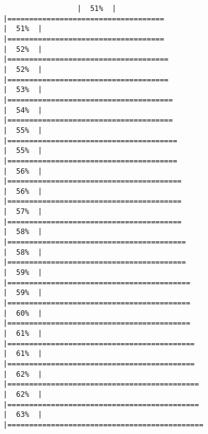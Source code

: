 \documentclass[
]{article}
\begin{document}
\begin{verbatim}
                 |  51%  |                                                                              |====================================                                  |  51%  |                                                                              |====================================                                  |  52%  |                                                                              |=====================================                                 |  52%  |                                                                              |=====================================                                 |  53%  |                                                                              |======================================                                |  54%  |                                                                              |======================================                                |  55%  |                                                                              |=======================================                               |  55%  |                                                                              |=======================================                               |  56%  |                                                                              |========================================                              |  56%  |                                                                              |========================================                              |  57%  |                                                                              |========================================                              |  58%  |                                                                              |=========================================                             |  58%  |                                                                              |=========================================                             |  59%  |                                                                              |==========================================                            |  59%  |                                                                              |==========================================                            |  60%  |                                                                              |==========================================                            |  61%  |                                                                              |===========================================                           |  61%  |                                                                              |===========================================                           |  62%  |                                                                              |============================================                          |  62%  |                                                                              |============================================                          |  63%  |                                                                              |=============================================         
\end{verbatim}
\end{document}

